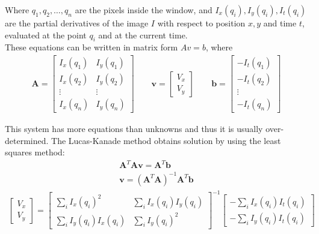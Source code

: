 Where $q_{1},q_{2},\dots ,q_{n}$ are the pixels inside the window, and $I_{x}(q_{i}),I_{y}(q_{i}),I_{t}(q_{i})$ are the partial derivatives of the image $I$ with respect to position $x, y$ and time $t$, evaluated at the point $q_{i}$ and at the current time.\\
These equations can be written in matrix form $Av=b$, where
\begin{align}
\boldsymbol{A}={\begin{bmatrix}I_{x}(q_{1})&I_{y}(q_{1})\\[10pt]I_{x}(q_{2})&I_{y}(q_{2})\\[10pt]\vdots &\vdots \\[10pt]I_{x}(q_{n})&I_{y}(q_{n})\end{bmatrix}} \quad \quad \boldsymbol{v}={\begin{bmatrix}V_{x}\\[10pt]V_{y}\end{bmatrix}} \quad \quad \boldsymbol{b}={\begin{bmatrix}-I_{t}(q_{1})\\[10pt]-I_{t}(q_{2})\\[10pt]\vdots \\[10pt]-I_{t}(q_{n})\end{bmatrix}}
\end{align}

This system has more equations than unknowns and thus it is usually over-determined. The Lucas-Kanade method obtains solution by using the least squares method:
\begin{subequations}
\begin{align}
\boldsymbol{A}^{T}\boldsymbol{Av}=\boldsymbol{A}^{T}\boldsymbol{b}\\[10pt]
{\boldsymbol{v}}=(\boldsymbol{A}^{T}\boldsymbol{A})^{{-1}}\boldsymbol{A}^{T}\boldsymbol{b}
\end{align}
\end{subequations}
\begin{align}
{\begin{bmatrix}
V_{x}\\[10pt]
V_{y}\end{bmatrix}}
=
{\begin{bmatrix}
\sum _{i}I_{x}(q_{i})^{2}&\sum _{i}I_{x}(q_{i})I_{y}(q_{i})\\[10pt]
\sum _{i}I_{y}(q_{i})I_{x}(q_{i})&\sum _{i}I_{y}(q_{i})^{2}
\end{bmatrix}}^{{-1}}
{\begin{bmatrix}
-\sum _{i}I_{x}(q_{i})I_{t}(q_{i})\\[10pt]
-\sum _{i}I_{y}(q_{i})I_{t}(q_{i})
\end{bmatrix}}
\end{align}

